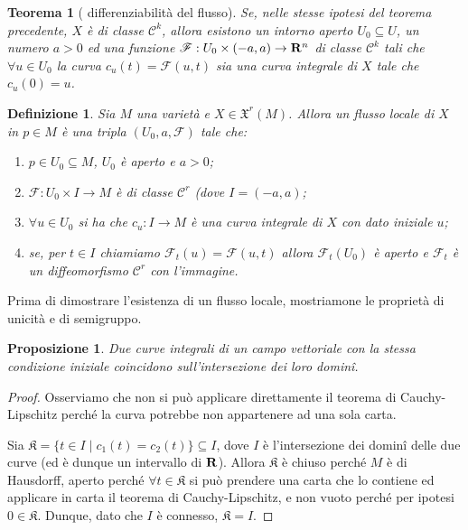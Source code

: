 \documentclass{article}
\newcommand{\incluso}{\subseteq}
\newcommand{\ci}[1]{\mathscr{#1}}%
\newcommand{\g}[1]{\mathfrak{#1}}
\newcommand{\volte}{\times}
\newcommand{\perogni}{\forall}
\newtheorem{definizione}{ Definizione}
\newtheorem{teor}{ Teorema}
\newtheorem{proposizione}{ Proposizione}
\begin{document}
 \begin{teor}[ differenziabilità del flusso]
  Se, nelle stesse ipotesi del teorema precedente, $X$ è di classe $\ci{C}^k$, allora
  esistono un intorno aperto $U_0\incluso U$, un numero $a>0$ ed una funzione
  $\ci{F}:U_0\volte (-a,a)\to{\bf R}^n$ di classe $\ci{C}^k$ tali che $\perogni u\in U_0$ la curva $c_u(t)=\ci{F}(u,t)$
  sia una curva integrale di $X$ tale che $c_u(0)=u$.
 \end{teor}

 \begin{definizione}
  Sia $M$ una varietà e $X\in\g{X}^r(M)$. Allora un flusso locale di $X$ in $p\in M$ è
  una tripla $(U_0,a,\ci{F})$ tale che:
  \begin{enumerate}[label=\bf\Roman*)]
   \item $p\in U_0\incluso M$, $U_0$ è aperto e $a>0$;
   \item $\ci{F}:U_0\volte I\to M$ è di classe $\ci{C}^r$ (dove $I=(-a,a)$;
   \item $\perogni u\in U_0$ si ha che $c_u:I\to M$ è una curva integrale di $X$
   con dato iniziale $u$;
   \item se, per $t\in I$ chiamiamo $\ci{F}_t(u)=\ci{F}(u,t)$ allora $\ci{F}_t(U_0)$ è aperto e
   $\ci{F}_t$ è un diffeomorfismo $\ci{C}^r$ con l'immagine.
  \end{enumerate}
 \end{definizione}

 Prima di dimostrare l'esistenza di un flusso locale, mostriamone le proprietà di
 unicità e di semigruppo.
 
 \begin{proposizione}
  Due curve integrali di un campo vettoriale con la stessa condizione iniziale
  coincidono sull'intersezione dei loro dominî.
 \end{proposizione}

 \begin{proof}
  Osserviamo che non si può applicare direttamente il teorema di Cauchy-Lipschitz
  perché la curva potrebbe non appartenere ad una sola carta.
  
  Sia $\g{K}=\{ t\in I\;|\; c_1(t)=c_2(t)\}\incluso I$, dove $I$ è l'intersezione dei
  dominî delle due curve (ed è dunque un intervallo di ${\bf R}$). Allora $\g{K}$ è chiuso perché $M$ è di
  Hausdorff, aperto perché $\perogni t\in\g{K}$ si può prendere una carta che lo contiene
  ed applicare in carta il teorema di Cauchy-Lipschitz, e non vuoto perché per ipotesi
  $0\in\g{K}$. Dunque, dato che $I$ è connesso, $\g{K}=I$.
 \end{proof}
\end{document}
